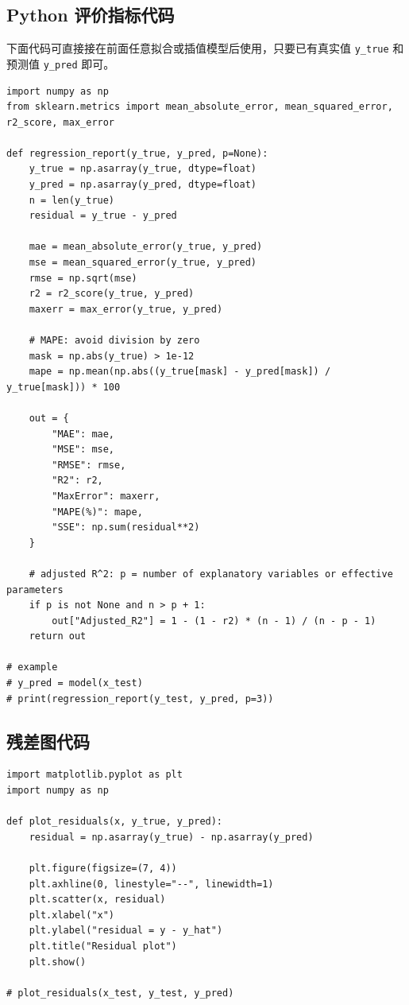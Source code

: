 \documentclass[11pt,a4paper]{ctexart}
\begin{document}
\subsection{Python 评价指标代码}

下面代码可直接接在前面任意拟合或插值模型后使用，只要已有真实值 \verb|y_true| 和预测值 \verb|y_pred| 即可。

\begin{lstlisting}
import numpy as np
from sklearn.metrics import mean_absolute_error, mean_squared_error, r2_score, max_error

def regression_report(y_true, y_pred, p=None):
    y_true = np.asarray(y_true, dtype=float)
    y_pred = np.asarray(y_pred, dtype=float)
    n = len(y_true)
    residual = y_true - y_pred

    mae = mean_absolute_error(y_true, y_pred)
    mse = mean_squared_error(y_true, y_pred)
    rmse = np.sqrt(mse)
    r2 = r2_score(y_true, y_pred)
    maxerr = max_error(y_true, y_pred)

    # MAPE: avoid division by zero
    mask = np.abs(y_true) > 1e-12
    mape = np.mean(np.abs((y_true[mask] - y_pred[mask]) / y_true[mask])) * 100

    out = {
        "MAE": mae,
        "MSE": mse,
        "RMSE": rmse,
        "R2": r2,
        "MaxError": maxerr,
        "MAPE(%)": mape,
        "SSE": np.sum(residual**2)
    }

    # adjusted R^2: p = number of explanatory variables or effective parameters
    if p is not None and n > p + 1:
        out["Adjusted_R2"] = 1 - (1 - r2) * (n - 1) / (n - p - 1)
    return out

# example
# y_pred = model(x_test)
# print(regression_report(y_test, y_pred, p=3))
\end{lstlisting}

\subsection{残差图代码}

\begin{lstlisting}
import matplotlib.pyplot as plt
import numpy as np

def plot_residuals(x, y_true, y_pred):
    residual = np.asarray(y_true) - np.asarray(y_pred)

    plt.figure(figsize=(7, 4))
    plt.axhline(0, linestyle="--", linewidth=1)
    plt.scatter(x, residual)
    plt.xlabel("x")
    plt.ylabel("residual = y - y_hat")
    plt.title("Residual plot")
    plt.show()

# plot_residuals(x_test, y_test, y_pred)
\end{lstlisting}
\end{document}
